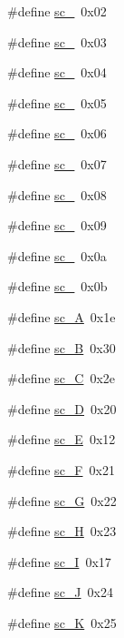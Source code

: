 \begin{DoxyCompactItemize}
\item 
\#define \hyperlink{ID__IN_8H_afd02d044421666cafb6f9a72d07c75ee}{sc\_}~0x02
\item 
\#define \hyperlink{ID__IN_8H_a2e291e92f53a876e1e3ebbeec7a86301}{sc\_}~0x03
\item 
\#define \hyperlink{ID__IN_8H_af5664e220c9ca85588b328d6a42c4e95}{sc\_}~0x04
\item 
\#define \hyperlink{ID__IN_8H_a48838fea402657d481d0d809d087a928}{sc\_}~0x05
\item 
\#define \hyperlink{ID__IN_8H_aafbcb8cc603d2dbcc8893f38cb8f9cae}{sc\_}~0x06
\item 
\#define \hyperlink{ID__IN_8H_accf5de03a8bf46eb0bd3881a69f575c1}{sc\_}~0x07
\item 
\#define \hyperlink{ID__IN_8H_abff31b74c899a6ccd633d6853691210d}{sc\_}~0x08
\item 
\#define \hyperlink{ID__IN_8H_a1ae0d70550193a93d0e62534b320fe0f}{sc\_}~0x09
\item 
\#define \hyperlink{ID__IN_8H_afc1da098d63c9780125b3488ed35960a}{sc\_}~0x0a
\item 
\#define \hyperlink{ID__IN_8H_a927e5c1be2dd2f87e6dc52dbee69e18c}{sc\_}~0x0b
\item 
\#define \hyperlink{ID__IN_8H_ac53fd1d19e529144ae928149a722a2cd}{sc\_\-A}~0x1e
\item 
\#define \hyperlink{ID__IN_8H_a3063b7d84ff3ac915dd3f9144e437ae0}{sc\_\-B}~0x30
\item 
\#define \hyperlink{ID__IN_8H_a297ea773ebb8336e3d5450f90088163e}{sc\_\-C}~0x2e
\item 
\#define \hyperlink{ID__IN_8H_ae1822418241e62021e2e36ac8a30534e}{sc\_\-D}~0x20
\item 
\#define \hyperlink{ID__IN_8H_a3afca48247d40ce41e80af6ffbb1f188}{sc\_\-E}~0x12
\item 
\#define \hyperlink{ID__IN_8H_a53b8ae1a17202d91380d319683507494}{sc\_\-F}~0x21
\item 
\#define \hyperlink{ID__IN_8H_a63672572d9ce8c31a962508ebdffa5ad}{sc\_\-G}~0x22
\item 
\#define \hyperlink{ID__IN_8H_a526628832b4771cbc27882ffd5eab1b5}{sc\_\-H}~0x23
\item 
\#define \hyperlink{ID__IN_8H_a6adbcf0026a4316804caca7fc279de19}{sc\_\-I}~0x17
\item 
\#define \hyperlink{ID__IN_8H_a13a73278e8e8ab44c44da1ec4d98b680}{sc\_\-J}~0x24
\item 
\#define \hyperlink{ID__IN_8H_a393e96e67168815b72d24c72e29efe8e}{sc\_\-K}~0x25

\end{DoxyCompactItemize}
